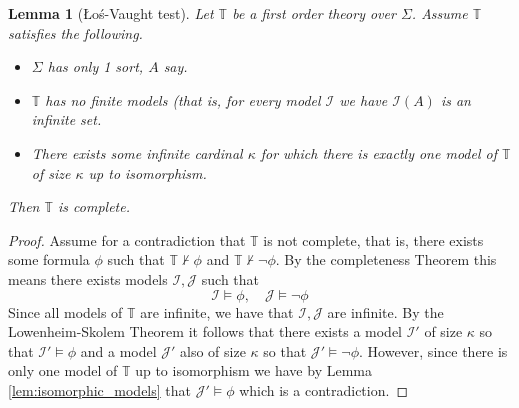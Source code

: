 \documentclass[12pt]{article}
\theoremstyle{plain}
\newtheorem{lemma}[thm]{Lemma}
\theoremstyle{definition}
\newcommand{\bb}[1]{\mathbb{#1}}
\newcommand{\call}[1]{\mathcal{#1}}
\begin{document}
	\begin{lemma}[\L o\'{s}-Vaught test]
		Let $\bb{T}$ be a first order theory over $\Sigma$. Assume $\bb{T}$ satisfies the following.
		\begin{itemize}
			\item $\Sigma$ has only 1 sort, $A$ say.
			\item $\bb{T}$ has no finite models (that is, for every model $\call{I}$ we have $\call{I}(A)$ is an infinite set.
			\item There exists some infinite cardinal $\kappa$ for which there is exactly one model of $\bb{T}$ of size $\kappa$ up to isomorphism.
			\end{itemize}
		Then $\bb{T}$ is complete.
		\end{lemma}
	\begin{proof}
		Assume for a contradiction that $\bb{T}$ is not complete, that is, there exists some formula $\phi$ such that $\bb{T} \not\vdash \phi$ and $\bb{T} \not\vdash \neg \phi$. By the completeness Theorem this means there exists models $\call{I}, \call{J}$ such that
		\begin{equation}
			\call{I} \models \phi,\quad \call{J} \models \neg \phi
			\end{equation}
		Since all models of $\bb{T}$ are infinite, we have that $\call{I}, \call{J}$ are infinite. By the Lowenheim-Skolem Theorem it follows that there exists a model $\call{I}'$ of size $\kappa$ so that $\call{I}' \models \phi$ and a model $\call{J}'$ also of size $\kappa$ so that $\call{J}' \models \neg \phi$. However, since there is only one model of $\bb{T}$ up to isomorphism we have by Lemma \ref{lem:isomorphic_models} that $\call{J}' \models \phi$ which is a contradiction.
		\end{proof}
\end{document}
